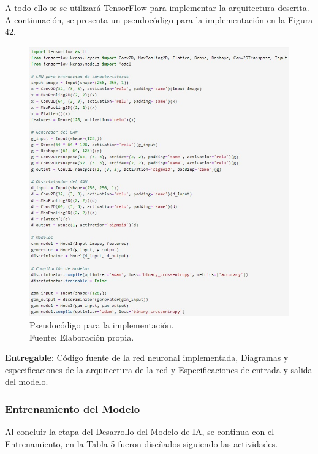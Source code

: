 A todo ello se se utilizará TensorFlow para implementar la arquitectura descrita. A continuación, se presenta un pseudocódigo para la implementación en la Figura 42.

\begin{figure}[H]
	\centering
	\includegraphics[width=1\textwidth]{3/figures/pseudocodigo.jpg}
	\caption[Pseudocódigo para la implementación]{Pseudocódigo para la implementación.\\ Fuente: Elaboración propia.}
	\label{3:7}
\end{figure}

\textbf{Entregable}: Código fuente de la red neuronal implementada, Diagramas y especificaciones de la arquitectura de la red y Especificaciones de entrada y salida del modelo.

\subsubsection{Entrenamiento del Modelo}
Al concluir la etapa del Desarrollo del Modelo de IA, se continua con el Entrenamiento, en la Tabla 5 fueron diseñados siguiendo las actividades.

